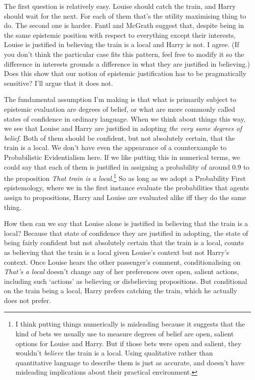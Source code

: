 The first question is relatively easy. Louise should catch the train, and Harry should wait for the next. For each of them that's the utility maximising thing to do. The second one is harder. Fantl and McGrath suggest that, despite being in the same epistemic position with respect to everything except their interests, Louise is justified in believing the train is a local and Harry is not. I agree. (If you don't think the particular case fits this pattern, feel free to modify it so the difference in interests grounds a difference in what they are justified in believing.) Does this show that our notion of epistemic justification has to be pragmatically sensitive? I'll argue that it does not.

The fundamental assumption I'm making is that what is primarily subject to epistemic evaluation are degrees of belief, or what are more commonly called states of confidence in ordinary language. When we think about things this way, we see that Louise and Harry are justified in adopting \textit{the very same degrees of belief}. Both of them should be confident, but not absolutely certain, that the train is a local. We don't have even the appearance of a counterxample to Probabilistic Evidentialism here. If we like putting this in numerical terms, we could say that each of them is justified in assigning a probability of around 0.9 to the proposition \textit{That train is a local}.\footnote{I think putting things numerically is misleading because it suggests that the kind of bets we usually use to measure degrees of belief are open, salient options for Louise and Harry. But if those bets were open and salient, they wouldn't \textit{believe} the train is a local. Using qualitative rather than quantitative language to describe them is just as accurate, and doesn't have misleading implications about their practical environment.} So as long as we adopt a Probability First epistemology, where we in the first instance evaluate the probabilities that agents assign to propositions, Harry and Louise are evaluated alike iff they do the same thing.

How then can we say that Louise alone is justified in believing that the train is a local? Because that state of confidence they are justified in adopting, the state of being fairly confident but not absolutely certain that the train is a local, counts as believing that the train is a local given Louise's context but not Harry's context. Once Louise hears the other passenger's comment, conditionalising on \textit{That's a local} doesn't change any of her preferences over open, salient actions, including such `actions' as believing or disbelieving propositions. But conditional on the train being a local, Harry prefers catching the train, which he actually does not prefer.

